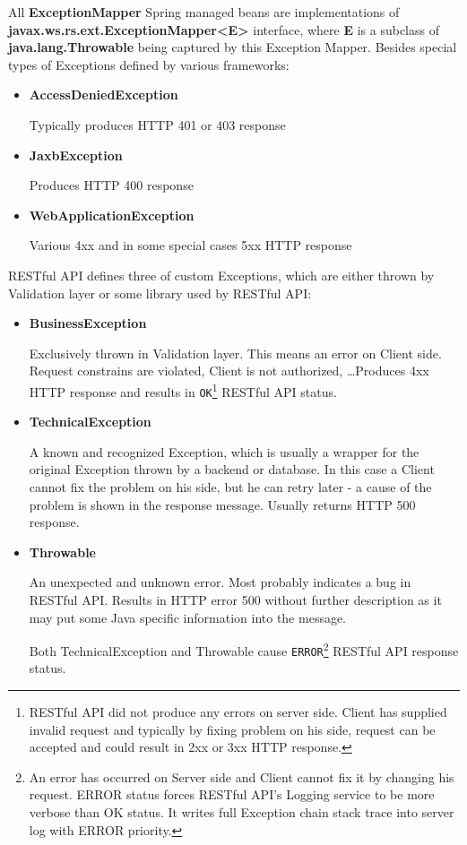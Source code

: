 	All \textbf{ExceptionMapper} Spring managed beans are implementations of
	\textbf{javax.ws.rs.ext.ExceptionMapper\textless{E}\textgreater} interface, where \textbf{E} is a subclass of
	\textbf{java.lang.Throwable} being captured by this Exception Mapper.
	Besides special types of Exceptions defined by various frameworks:
	
	\begin{itemize}
		\item \textbf{AccessDeniedException}
		
		Typically produces HTTP 401 or 403 response
		\item \textbf{JaxbException}
		
		Produces HTTP 400 response
		\item \textbf{WebApplicationException}
		
		Various 4xx and in some special cases 5xx HTTP response
	\end{itemize}
	
	RESTful API defines three  of custom Exceptions, which are either thrown by Validation layer or some library
	used by RESTful API:
	
	\begin{itemize}
		\item \textbf{BusinessException}
		
		Exclusively thrown in Validation layer. This means an error on Client side. Request constrains are violated, Client
		is not authorized, \ldots Produces 4xx HTTP response and results in \verb|OK|\footnote{RESTful API did not produce
		any errors on server side. Client has supplied invalid request and typically by fixing problem on his side, request
		can be accepted and could result in 2xx or 3xx HTTP response.} RESTful API status.
		\item \textbf{TechnicalException}
		
		A known and recognized Exception, which is usually a wrapper for the original Exception thrown by a backend or
		database. In this case a Client cannot fix the problem on his side, but he can retry later - a cause of the problem
		is shown in the response message. Usually returns HTTP 500 response.
		\item \textbf{Throwable}
		
		An unexpected and unknown error. Most probably indicates a bug in RESTful API. Results in HTTP error 500 without
		further description as it may put some Java specific information into the message.
		
		Both TechnicalException and Throwable cause \verb|ERROR|\footnote{An error has occurred on Server side and Client
		cannot fix it by changing his request. ERROR status forces RESTful API's Logging service to be more verbose than OK
		status. It writes full Exception chain stack trace into server log with ERROR priority.} RESTful API response status.
	\end{itemize}
	
